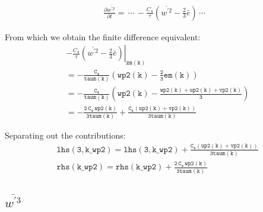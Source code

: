 \documentclass[11pt,fleqn]{article}
\newcommand{\ptlder}[2]{\frac{\partial #1}{\partial #2}}
\begin{document}
\begin{equation}
\begin{split}
\ptlder{\overline{w^{'2}}}{t} =
  \, \cdots \,
  - \frac{C_4}{\tau} \left( \overline{w^{'2}} - \frac{2}{3} \bar{e} \right)
  \, \cdots
\end{split}
\end{equation}
%

From which we obtain the finite difference equivalent:
%
\begin{equation}
\begin{split}
& \left.
  - \frac{C_4}{\tau} 
    \left( \overline{w^{'2}} - \frac{2}{3} \bar{e} 
    \right)
  \right|_{\mathtt{zm(k)}} \\
&= \mathtt{ -\frac{C_4}{taum(k)} 
    \left( 
      wp2(k) - \frac{2}{3} em(k) 
    \right) 
   } \\
&= \mathtt{ -\frac{C_4}{taum(k)} 
             \left(
               wp2(k) - \frac{wp2(k) + up2(k) + vp2(k)}{3}
             \right)
          } \\
&= \mathtt{ -\frac{2 \, C_4 \, wp2(k)}{3 taum(k)} + \frac{C_4 \left( up2(k) + vp2(k) \right)}{3 taum(k)} }
\end{split}
\end{equation}
%

Separating out the contributions:
%
\begin{equation}
\begin{split}
& \mathtt{
  lhs(3,k\_wp2) = lhs(3,k\_wp2) + \frac{C_4 \left( up2(k) + vp2(k) \right)}{3 taum(k) }
  } \\
& \mathtt{
  rhs(k\_wp2) = rhs(k\_wp2) + \frac{2 \, C_4 \, wp2(k) }{3 taum(k)} 
  }
\end{split}
\end{equation}




\subsection{$\overline{w^{'3}}$}
\end{document}
